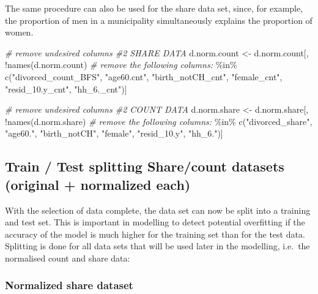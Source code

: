 \documentclass[
]{article}
\newenvironment{Shaded}{\begin{snugshade}}{\end{snugshade}}
\newcommand{\CommentTok}[1]{\textcolor[rgb]{0.56,0.35,0.01}{\textit{#1}}}
\newcommand{\FunctionTok}[1]{\textcolor[rgb]{0.00,0.00,0.00}{#1}}
\newcommand{\NormalTok}[1]{#1}
\newcommand{\OtherTok}[1]{\textcolor[rgb]{0.56,0.35,0.01}{#1}}
\newcommand{\SpecialCharTok}[1]{\textcolor[rgb]{0.00,0.00,0.00}{#1}}
\newcommand{\StringTok}[1]{\textcolor[rgb]{0.31,0.60,0.02}{#1}}
\begin{document}
The same procedure can also be used for the share data set, since, for
example, the proportion of men in a municipality simultaneously explains
the proportion of women.

\begin{Shaded}
\begin{Highlighting}[]
\CommentTok{\# remove undesired columns \#2 SHARE DATA}
\NormalTok{d.norm.count }\OtherTok{\textless{}{-}}\NormalTok{ d.norm.count[, }\SpecialCharTok{!}\FunctionTok{names}\NormalTok{(d.norm.count) }\CommentTok{\# remove the following columns:}
                             \SpecialCharTok{\%in\%} \FunctionTok{c}\NormalTok{(}\StringTok{"divorced\_count\_BFS"}\NormalTok{, }\StringTok{"age60.cnt"}\NormalTok{, }\StringTok{"birth\_notCH\_cnt"}\NormalTok{, }
                                    \StringTok{"female\_cnt"}\NormalTok{, }\StringTok{"resid\_10.y\_cnt"}\NormalTok{, }\StringTok{"hh\_6.\_cnt"}\NormalTok{)]}

\CommentTok{\# remove undesired columns \#2 COUNT DATA}
\NormalTok{d.norm.share }\OtherTok{\textless{}{-}}\NormalTok{ d.norm.share[, }\SpecialCharTok{!}\FunctionTok{names}\NormalTok{(d.norm.share) }\CommentTok{\# remove the following columns: }
                             \SpecialCharTok{\%in\%} \FunctionTok{c}\NormalTok{(}\StringTok{"divorced\_share"}\NormalTok{, }\StringTok{"age60."}\NormalTok{, }\StringTok{"birth\_notCH"}\NormalTok{, }
                                    \StringTok{"female"}\NormalTok{, }\StringTok{"resid\_10.y"}\NormalTok{, }\StringTok{"hh\_6."}\NormalTok{)]}
\end{Highlighting}
\end{Shaded}

\hypertarget{train-test-splitting-sharecount-datasets-original-normalized-each}{%
\subsection{Train / Test splitting Share/count datasets (original +
normalized
each)}\label{train-test-splitting-sharecount-datasets-original-normalized-each}}

With the selection of data complete, the data set can now be split into
a training and test set. This is important in modelling to detect
potential overfitting if the accuracy of the model is much higher for
the training set than for the test data. Splitting is done for all data
sets that will be used later in the modelling, i.e.~the normalised count
and share data:

\hypertarget{normalized-share-dataset}{%
\subsubsection{Normalized share
dataset}\label{normalized-share-dataset}}
\end{document}
